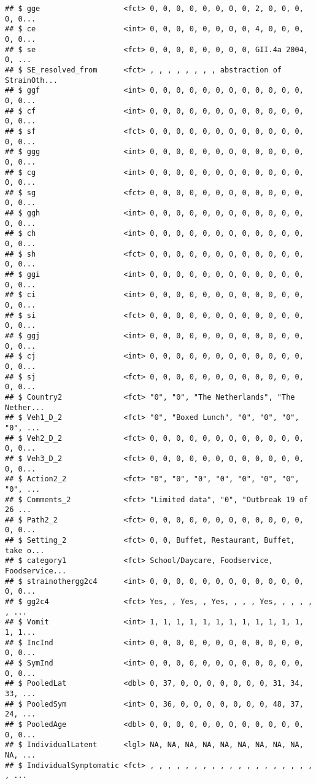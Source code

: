 \documentclass[]{article}
\begin{document}
\begin{verbatim}
## $ gge                   <fct> 0, 0, 0, 0, 0, 0, 0, 0, 2, 0, 0, 0, 0, 0...
## $ ce                    <int> 0, 0, 0, 0, 0, 0, 0, 0, 4, 0, 0, 0, 0, 0...
## $ se                    <fct> 0, 0, 0, 0, 0, 0, 0, 0, GII.4a 2004, 0, ...
## $ SE_resolved_from      <fct> , , , , , , , , abstraction of StrainOth...
## $ ggf                   <int> 0, 0, 0, 0, 0, 0, 0, 0, 0, 0, 0, 0, 0, 0...
## $ cf                    <int> 0, 0, 0, 0, 0, 0, 0, 0, 0, 0, 0, 0, 0, 0...
## $ sf                    <fct> 0, 0, 0, 0, 0, 0, 0, 0, 0, 0, 0, 0, 0, 0...
## $ ggg                   <int> 0, 0, 0, 0, 0, 0, 0, 0, 0, 0, 0, 0, 0, 0...
## $ cg                    <int> 0, 0, 0, 0, 0, 0, 0, 0, 0, 0, 0, 0, 0, 0...
## $ sg                    <fct> 0, 0, 0, 0, 0, 0, 0, 0, 0, 0, 0, 0, 0, 0...
## $ ggh                   <int> 0, 0, 0, 0, 0, 0, 0, 0, 0, 0, 0, 0, 0, 0...
## $ ch                    <int> 0, 0, 0, 0, 0, 0, 0, 0, 0, 0, 0, 0, 0, 0...
## $ sh                    <fct> 0, 0, 0, 0, 0, 0, 0, 0, 0, 0, 0, 0, 0, 0...
## $ ggi                   <int> 0, 0, 0, 0, 0, 0, 0, 0, 0, 0, 0, 0, 0, 0...
## $ ci                    <int> 0, 0, 0, 0, 0, 0, 0, 0, 0, 0, 0, 0, 0, 0...
## $ si                    <fct> 0, 0, 0, 0, 0, 0, 0, 0, 0, 0, 0, 0, 0, 0...
## $ ggj                   <int> 0, 0, 0, 0, 0, 0, 0, 0, 0, 0, 0, 0, 0, 0...
## $ cj                    <int> 0, 0, 0, 0, 0, 0, 0, 0, 0, 0, 0, 0, 0, 0...
## $ sj                    <fct> 0, 0, 0, 0, 0, 0, 0, 0, 0, 0, 0, 0, 0, 0...
## $ Country2              <fct> "0", "0", "The Netherlands", "The Nether...
## $ Veh1_D_2              <fct> "0", "Boxed Lunch", "0", "0", "0", "0", ...
## $ Veh2_D_2              <fct> 0, 0, 0, 0, 0, 0, 0, 0, 0, 0, 0, 0, 0, 0...
## $ Veh3_D_2              <fct> 0, 0, 0, 0, 0, 0, 0, 0, 0, 0, 0, 0, 0, 0...
## $ Action2_2             <fct> "0", "0", "0", "0", "0", "0", "0", "0", ...
## $ Comments_2            <fct> "Limited data", "0", "Outbreak 19 of 26 ...
## $ Path2_2               <fct> 0, 0, 0, 0, 0, 0, 0, 0, 0, 0, 0, 0, 0, 0...
## $ Setting_2             <fct> 0, 0, Buffet, Restaurant, Buffet, take o...
## $ category1             <fct> School/Daycare, Foodservice, Foodservice...
## $ strainothergg2c4      <int> 0, 0, 0, 0, 0, 0, 0, 0, 0, 0, 0, 0, 0, 0...
## $ gg2c4                 <fct> Yes, , Yes, , Yes, , , , Yes, , , , , , ...
## $ Vomit                 <int> 1, 1, 1, 1, 1, 1, 1, 1, 1, 1, 1, 1, 1, 1...
## $ IncInd                <int> 0, 0, 0, 0, 0, 0, 0, 0, 0, 0, 0, 0, 0, 0...
## $ SymInd                <int> 0, 0, 0, 0, 0, 0, 0, 0, 0, 0, 0, 0, 0, 0...
## $ PooledLat             <dbl> 0, 37, 0, 0, 0, 0, 0, 0, 0, 31, 34, 33, ...
## $ PooledSym             <int> 0, 36, 0, 0, 0, 0, 0, 0, 0, 48, 37, 24, ...
## $ PooledAge             <dbl> 0, 0, 0, 0, 0, 0, 0, 0, 0, 0, 0, 0, 0, 0...
## $ IndividualLatent      <lgl> NA, NA, NA, NA, NA, NA, NA, NA, NA, NA, ...
## $ IndividualSymptomatic <fct> , , , , , , , , , , , , , , , , , , , , ...
\end{verbatim}
\end{document}
